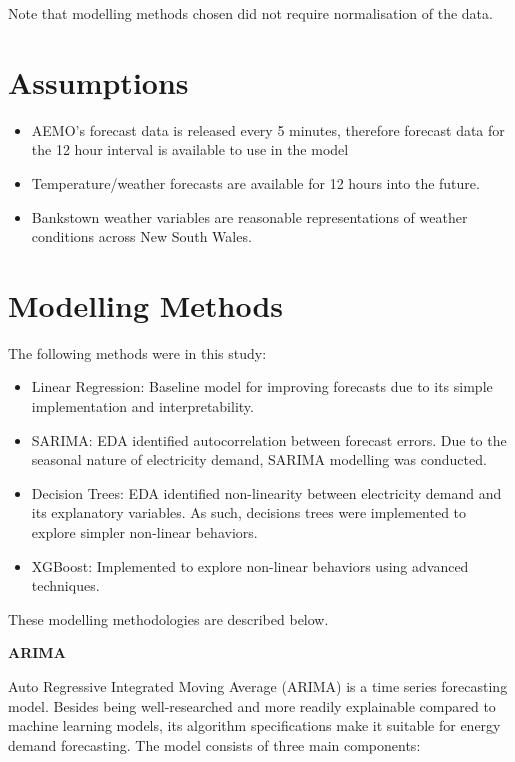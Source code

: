 \documentclass[mstat,12pt]{unswthesis}
\begin{document}
Note that modelling methods chosen did not require normalisation of the data.

\section{Assumptions}\label{assumptions}

\begin{itemize}
\item
  AEMO's forecast data is released every 5 minutes, therefore forecast data for the 12 hour interval is available to use in the model
\item
  Temperature/weather forecasts are available for 12 hours into the future.
\item
  Bankstown weather variables are reasonable representations of weather conditions across New South Wales.
\end{itemize}

\section{Modelling Methods}\label{modelling-methods}

The following methods were in this study:

\begin{itemize}
\item
  Linear Regression: Baseline model for improving forecasts due to its simple implementation and interpretability.
\item
  SARIMA: EDA identified autocorrelation between forecast errors. Due to the seasonal nature of electricity demand, SARIMA modelling was conducted.
\item
  Decision Trees: EDA identified non-linearity between electricity demand and its explanatory variables. As such, decisions trees were implemented to explore simpler non-linear behaviors.
\item
  XGBoost: Implemented to explore non-linear behaviors using advanced techniques.
\end{itemize}

These modelling methodologies are described below.

\bigskip

\noindent \textbf{ARIMA}

\bigskip

\noindent Auto Regressive Integrated Moving Average (ARIMA) is a time series forecasting model. Besides being well-researched and more readily explainable compared to machine learning models, its algorithm specifications make it suitable for energy demand forecasting. The model consists of three main components:
\end{document}
